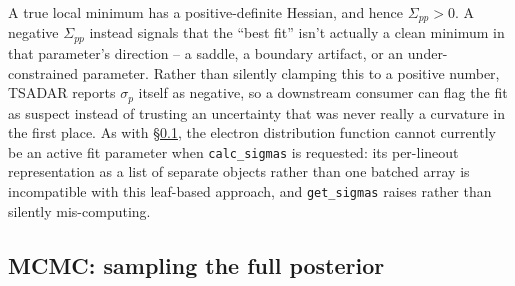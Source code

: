 \documentclass[11pt]{article}
\newcommand{\code}[1]{\texttt{#1}}
\begin{document}
A true local minimum has a positive-definite Hessian, and hence $\Sigma_{pp}>0$. A negative
$\Sigma_{pp}$ instead signals that the ``best fit'' isn't actually a clean minimum in that
parameter's direction -- a saddle, a boundary artifact, or an under-constrained parameter.
Rather than silently clamping this to a positive number, TSADAR reports $\sigma_p$ itself
as negative, so a downstream consumer can flag the fit as suspect instead of trusting an
uncertainty that was never really a curvature in the first place. As with
\S\ref{sec:uq-mcmc}, the electron distribution function cannot currently be an active fit
parameter when \code{calc\_sigmas} is requested: its per-lineout representation as a list of
separate objects rather than one batched array is incompatible with this leaf-based
approach, and \code{get\_sigmas} raises rather than silently mis-computing.

\subsection{MCMC: sampling the full posterior}\label{sec:uq-mcmc}
\end{document}
